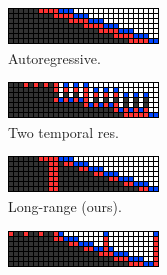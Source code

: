 \begin{figure}[t!]
    \centering
    \begin{subfigure}[t]{0.24\textwidth}
        \centering
        \includegraphics[width=\textwidth]{figs/fdm/unconditional-inference-modes/sample_vis_autoreg_T=30_sampling_3_out_of_7_red_blue_flipped.png}
        \caption{\footnotesize Autoregressive.} \label{fig:autoreg-vis}
    \end{subfigure}
    \begin{subfigure}[t]{0.24\textwidth}
        \centering
        \includegraphics[width=\textwidth]{figs/fdm/unconditional-inference-modes/sample_vis_baby-cond-ho-et-al-for-vis_T=30_sampling_3_out_of_7_red_blue_flipped.png}
        \caption{\footnotesize Two temporal res.} \label{fig:google-vis}
    \end{subfigure}
    \begin{subfigure}[t]{0.24\textwidth}
        \centering
        \includegraphics[width=\textwidth]{figs/fdm/unconditional-inference-modes/sample_vis_mixed-autoreg-independent_T=30_sampling_3_out_of_7_red_blue_flipped.png}
        \caption{\footnotesize Long-range (ours).} \label{fig:mixed-vis}
    \end{subfigure}
    \begin{subfigure}[t]{0.24\textwidth}
        \centering
        \includegraphics[width=\textwidth]{figs/fdm/unconditional-inference-modes/sample_vis_hierarchy-2_T=30_sampling_3_out_of_7_red_blue_flipped.png}

\end{subfigure}
\end{figure}
